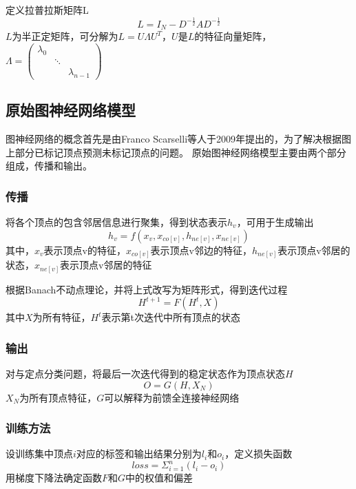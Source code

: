 \begin{definition}
    定义拉普拉斯矩阵L
    \begin{equation}
        L=I_N-D^{-\frac{1}{2}}AD^{-\frac{1}{2}}
    \end{equation}
    $L$为半正定矩阵，可分解为$L=U\Lambda U^{T}$，$U$是$L$的特征向量矩阵，$\Lambda=\left(\begin{array}{ccc}
        \lambda_{0} & & \\
        & \ddots & \\
        & & \lambda_{n-1}
        \end{array}\right)$
\end{definition}

\subsection{原始图神经网络模型}

图神经网络的概念首先是由Franco Scarselli等人于2009年提出的\cite{franco}，为了解决根据图上部分已标记顶点预测未标记顶点的问题。
原始图神经网络模型主要由两个部分组成，传播和输出。

\subsubsection{传播}
将各个顶点的包含邻居信息进行聚集，得到状态表示$h_v$，可用于生成输出
\begin{equation}
    h_v=f(x_v,x_{co[v]},h_{ne[v]},x_{ne[v]})
\end{equation}
其中，$x_v$表示顶点v的特征，$x_{co[v]}$表示顶点v邻边的特征，$h_{ne[v]}$表示顶点v邻居的状态，$x_{ne[v]}$表示顶点v邻居的特征

根据Banach不动点理论，并将上式改写为矩阵形式，得到迭代过程
\begin{equation}
    H^{t+1}=F(H^t,X)
\end{equation}
其中$X$为所有特征，$H^t$表示第t次迭代中所有顶点的状态

\subsubsection{输出}
对与定点分类问题，将最后一次迭代得到的稳定状态作为顶点状态$H$
\begin{equation}
    O=G(H,X_N)
\end{equation}
$X_N$为所有顶点特征，$G$可以解释为前馈全连接神经网络

\subsubsection{训练方法}
设训练集中顶点$i$对应的标签和输出结果分别为$l_i$和$o_i$，定义损失函数
\begin{equation}
    loss=\Sigma ^n_{i=1} (l_i-o_i)
\end{equation}
用梯度下降法确定函数$F$和$G$中的权值和偏差

